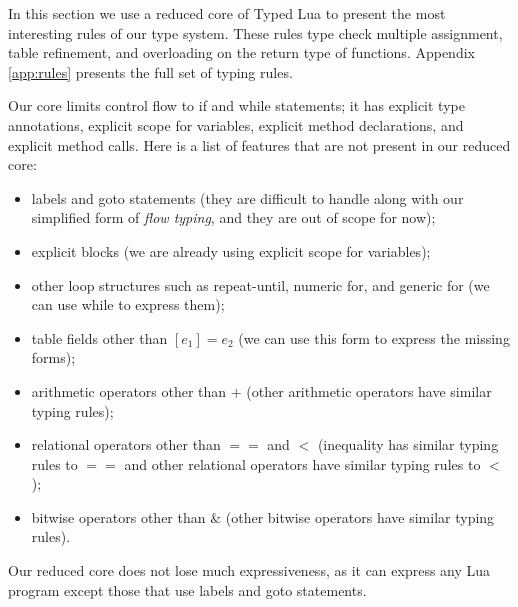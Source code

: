 In this section we use a reduced core of Typed Lua to present the
most interesting rules of our type system.
These rules type check multiple assignment, table refinement,
and overloading on the return type of functions.
Appendix \ref{app:rules} presents the full set of typing rules.

Our core limits control flow to if and while statements;
it has explicit type annotations, explicit scope for variables,
explicit method declarations, and explicit method calls.
Here is a list of features that are not present in our reduced core:
\begin{itemize}
\item labels and goto statements (they are difficult to handle along
with our simplified form of \emph{flow typing}, and they are out of
scope for now);
\item explicit blocks (we are already using explicit scope for variables);
\item other loop structures such as repeat-until, numeric for,
and generic for (we can use while to express them);
\item table fields other than $[e_{1}] = e_{2}$
(we can use this form to express the missing forms); 
\item arithmetic operators other than $+$
(other arithmetic operators have similar typing rules);
\item relational operators other than $==$ and $<$
(inequality has similar typing rules to $==$ and
other relational operators have similar typing rules to $<$);
\item bitwise operators other than $\&$
(other bitwise operators have similar typing rules).
\end{itemize}

Our reduced core does not lose much expressiveness, as it can express
any Lua program except those that use labels and goto statements.


